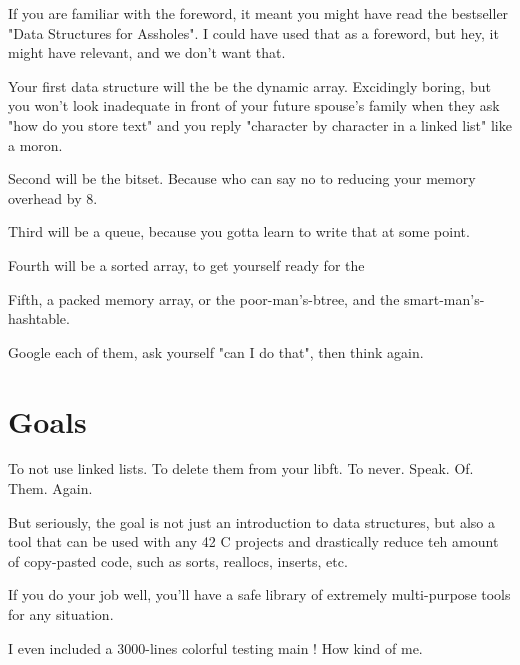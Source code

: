 \documentclass{42-en}
\begin{document}
    If you are familiar with the foreword, it meant you might have read the bestseller "Data Structures for Assholes".
    I could have used that as a foreword, but hey, it might have relevant, and we don't want that.

    Your first data structure will the be the dynamic array. Excidingly boring, but you won't look
    inadequate in front of your future spouse's family when they ask "how do you store text" and you reply
    "character by character in a linked list" like a moron.

    Second will be the bitset. Because who can say no to reducing your memory overhead by 8.

    Third will be a queue, because you gotta learn to write that at some point.

    Fourth will be a sorted array, to get yourself ready for the

    Fifth, a packed memory array, or the poor-man's-btree, and the smart-man's-hashtable.

    Google each of them, ask yourself "can I do that", then think again.


\chapter{Goals}

    To not use linked lists. To delete them from your libft. To never. Speak. Of. Them. Again.

    But seriously, the goal is not just an introduction to data structures, but also a tool
    that can be used with any 42 C projects and drastically reduce teh amount of copy-pasted code, such
    as sorts, reallocs, inserts, etc.

    If you do your job well, you'll have a safe library of extremely multi-purpose tools for any situation.

    I even included a 3000-lines colorful testing main ! How kind of me.


\end{document}
